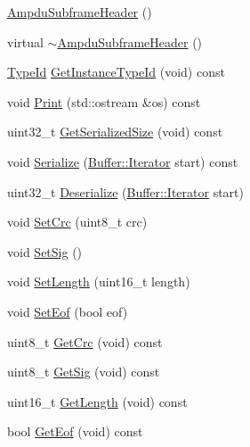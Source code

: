 \begin{DoxyCompactItemize}
\item 
\hyperlink{classns3_1_1AmpduSubframeHeader_ab9088f425a84efcedb50df57a044c403}{Ampdu\+Subframe\+Header} ()
\item 
virtual \hyperlink{classns3_1_1AmpduSubframeHeader_aa41c3e9b604404e94e0104af756a1b6a}{$\sim$\+Ampdu\+Subframe\+Header} ()
\item 
\hyperlink{classns3_1_1TypeId}{Type\+Id} \hyperlink{classns3_1_1AmpduSubframeHeader_a4abc2fc43677f3a269b84a34de218b65}{Get\+Instance\+Type\+Id} (void) const 
\item 
void \hyperlink{classns3_1_1AmpduSubframeHeader_ac4513fb1e5cedb38cd4923269fe5bf38}{Print} (std\+::ostream \&os) const 
\item 
uint32\+\_\+t \hyperlink{classns3_1_1AmpduSubframeHeader_af3b80c355daf62b86d531f18b4a6627a}{Get\+Serialized\+Size} (void) const 
\item 
void \hyperlink{classns3_1_1AmpduSubframeHeader_ad8e3ea90c8e73ecae11c3329df1582fc}{Serialize} (\hyperlink{classns3_1_1Buffer_1_1Iterator}{Buffer\+::\+Iterator} start) const 
\item 
uint32\+\_\+t \hyperlink{classns3_1_1AmpduSubframeHeader_ad0d11be3639b165e9e50a8da64117d9a}{Deserialize} (\hyperlink{classns3_1_1Buffer_1_1Iterator}{Buffer\+::\+Iterator} start)
\item 
void \hyperlink{classns3_1_1AmpduSubframeHeader_a388e84fe8dc67e413b38164a65408e7d}{Set\+Crc} (uint8\+\_\+t crc)
\item 
void \hyperlink{classns3_1_1AmpduSubframeHeader_a88245567b46e4dbf4f19efeae8f1a818}{Set\+Sig} ()
\item 
void \hyperlink{classns3_1_1AmpduSubframeHeader_a4078742f4bb1e40fa3fe9391d360a6a6}{Set\+Length} (uint16\+\_\+t length)
\item 
void \hyperlink{classns3_1_1AmpduSubframeHeader_a20c24042033d8609f3ea79d21bac6364}{Set\+Eof} (bool eof)
\item 
uint8\+\_\+t \hyperlink{classns3_1_1AmpduSubframeHeader_a73407d515eb60e081379e2a8d9135610}{Get\+Crc} (void) const 
\item 
uint8\+\_\+t \hyperlink{classns3_1_1AmpduSubframeHeader_ad003c0ee40b51347cfbaaa650638cd5b}{Get\+Sig} (void) const 
\item 
uint16\+\_\+t \hyperlink{classns3_1_1AmpduSubframeHeader_a1417afe062f1423e6562986b2fd82b4c}{Get\+Length} (void) const 
\item 
bool \hyperlink{classns3_1_1AmpduSubframeHeader_a488fd777e0b9bb33fbc42040262fc2c8}{Get\+Eof} (void) const 
\end{DoxyCompactItemize}
